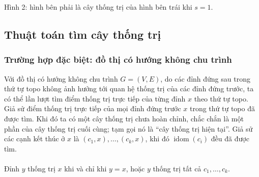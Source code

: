 \documentclass[11pt]{article}
\begin{document}
\begin{center}

Hình 2: hình bên phải là cây thống trị của hình bên trái khi \(s=1\).
\end{center}

\subsection{Thuật toán tìm cây thống trị}

\subsubsection{Trường hợp đặc biệt: đồ thị có hướng không chu trình}

Với đồ thị có hướng không chu trình \(G=(V,E)\), do các đỉnh đứng sau trong thứ
tự topo không ảnh hưởng tới quan hệ thống trị của các đỉnh đứng trước, ta có
thể lần lượt tìm điểm thống trị trực tiếp của từng đỉnh \(x\) theo thứ tự topo.
Giả sử điểm thống trị trực tiếp của mọi đỉnh đứng trước \(x\) trong thứ tự topo
đã được tìm. Khi đó ta có một cây thống trị chưa hoàn chỉnh, chắc chắn là một
phần của cây thống trị cuối cùng; tạm gọi nó là ``cây thống trị hiện tại''. Giả
sử các cạnh kết thúc ở \(x\) là \((c_1,x),\ldots,(c_k,x)\), khi đó
\(\operatorname{idom}(c_i)\) đều đã được tìm.

\paragraph{}
Đỉnh \(y\) thống trị \(x\) khi và chỉ khi \(y=x\), hoặc \(y\) thống trị tất cả
\(c_1,\ldots,c_k\).
\end{document}
